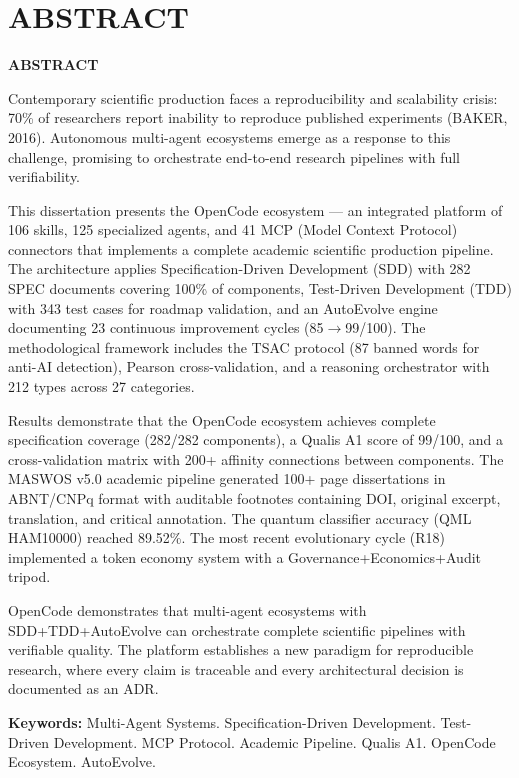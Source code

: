\chapter*{ABSTRACT}
\thispagestyle{empty}

\begin{center}
  {\Large\bfseries ABSTRACT\par}
\end{center}
\vspace{1cm}

Contemporary scientific production faces a reproducibility and scalability crisis: 70\% of researchers report inability to reproduce published experiments (BAKER, 2016). Autonomous multi-agent ecosystems emerge as a response to this challenge, promising to orchestrate end-to-end research pipelines with full verifiability.

This dissertation presents the OpenCode ecosystem --- an integrated platform of 106 skills, 125 specialized agents, and 41 MCP (Model Context Protocol) connectors that implements a complete academic scientific production pipeline. The architecture applies Specification-Driven Development (SDD) with 282 SPEC documents covering 100\% of components, Test-Driven Development (TDD) with 343 test cases for roadmap validation, and an AutoEvolve engine documenting 23 continuous improvement cycles (85$\rightarrow$99/100). The methodological framework includes the TSAC protocol (87 banned words for anti-AI detection), Pearson cross-validation, and a reasoning orchestrator with 212 types across 27 categories.

Results demonstrate that the OpenCode ecosystem achieves complete specification coverage (282/282 components), a Qualis A1 score of 99/100, and a cross-validation matrix with 200+ affinity connections between components. The MASWOS v5.0 academic pipeline generated 100+ page dissertations in ABNT/CNPq format with auditable footnotes containing DOI, original excerpt, translation, and critical annotation. The quantum classifier accuracy (QML HAM10000) reached 89.52\%. The most recent evolutionary cycle (R18) implemented a token economy system with a Governance+Economics+Audit tripod.

OpenCode demonstrates that multi-agent ecosystems with SDD+\-TDD+\-Auto\-Evolve can orchestrate complete scientific pipelines with verifiable quality. The platform establishes a new paradigm for reproducible research, where every claim is traceable and every architectural decision is documented as an ADR.

\vspace{1cm}
\noindent\textbf{Keywords:} Multi-Agent Systems. Specification-Driven Development. Test-Driven Development. MCP Protocol. Academic Pipeline. Qualis A1. OpenCode Ecosystem. AutoEvolve.
\newpage
